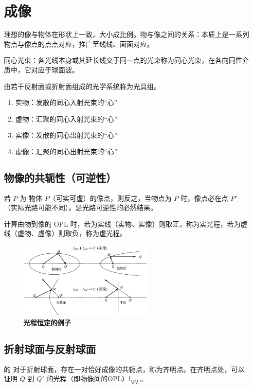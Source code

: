 \documentclass[UTF8]{report}
\theoremstyle{MyLineTheoremStyle} %
\theoremstyle{MyBlockTheoremStyle} %
\theoremstyle{MySubsubsectionStyle} %
\begin{document}
\section{成像}

理想的像与物体在形状上一致，大小成比例。物与像之间的关系：本质上是一系列物点与像点的点点对应，推广至线线、面面对应。

同心光束：各光线本身或其延长线交于同一点的光束称为同心光束，在各向同性介质中，它对应于球面波。

由若干反射面或折射面组成的光学系统称为光具组。

\begin{enumerate}
\item 实物：发散的同心入射光束的“心”
\item 虚物：汇聚的同心入射光束的“心”
\item 实像：发散的同心出射光束的“心”
\item 虚像：汇聚的同心出射光束的“心”
\end{enumerate}

\subsection{物像的共轭性（可逆性）}

若 $P$ 为 物体 $P$（可实可虚）的像点，则反之，当物点为 $P$ 时，像点必在点 $P'$（实际光路可能不同）。是光路可逆性的必然结果。 

计算由物到像的 OPL 时，若为实线（实物、实像）则取正，称为实光程，若为虚线（虚物、虚像）则取负，称为虚光程。

\begin{figure}[H]\centering
\includegraphics[width=0.6\textwidth]{assets/1,2/path2.pdf}
\caption{\textbf{光程恒定的例子}}\label{光程恒定的例子}
\end{figure}


\subsection{折射球面与反射球面}


的
对于折射球面，存在一对恰好成像的共轭点，称为齐明点。在齐明点处，可以证明 $Q$ 到 $Q'$ 的光程（即物像间的OPL）$l_{QQ'}$。
\end{document}
